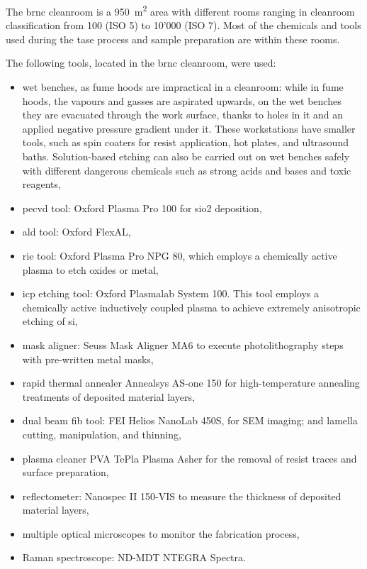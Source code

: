 The \acs{brnc} cleanroom is a \qty{950}{\m^2} area with different rooms ranging in cleanroom classification from 100 (ISO 5) to 10’000 (ISO 7). Most of the chemicals and tools used during the \acf{tase} process and sample preparation are within these rooms. 
\par
The following tools, located in the \acs{brnc} cleanroom, were used:
\begin{itemize}
    \item wet benches, as fume hoods are impractical in a cleanroom: while in fume hoods, the vapours and gasses are aspirated upwards, on the wet benches they are evacuated through the work surface, thanks to holes in it and an applied negative pressure gradient under it. These workstations have smaller tools, such as spin coaters for resist application, hot plates, and ultrasound baths. Solution-based etching can also be carried out on wet benches safely with different dangerous chemicals such as strong acids and bases and toxic reagents,
    \item \acf{pecvd} tool: Oxford Plasma Pro 100 for \acl{sio2} deposition,
    \item \acf{ald} tool: Oxford FlexAL,
    \item \acf{rie} tool: Oxford Plasma Pro NPG 80, which employs a chemically active plasma to etch oxides or metal,
    \item \acf{icp} etching tool: Oxford Plasmalab System 100. This tool employs a chemically active inductively coupled plasma to achieve extremely anisotropic etching of \acl{si},
    \item mask aligner: Seuss Mask Aligner MA6 to execute photolithography steps with pre-written metal masks,
    \item rapid thermal annealer Annealsys AS-one 150 for high-temperature annealing treatments of deposited material layers,
    \item dual beam \acf{fib} tool: FEI Helios NanoLab 450S, for SEM imaging; and lamella cutting, manipulation, and thinning,
    \item plasma cleaner PVA TePla Plasma Asher for the removal of resist traces and surface preparation,
    \item reflectometer: Nanospec II 150-VIS to measure the thickness of deposited material layers,
    \item multiple optical microscopes to monitor the fabrication process,
    \item Raman spectroscope: ND-MDT NTEGRA Spectra.
\end{itemize}
 

